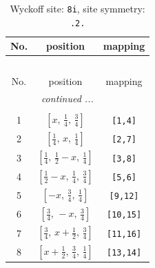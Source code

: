 \documentclass[fleqn,8pt]{jsarticle}
\begin{document}
\renewcommand{\arraystretch}{1.2}
\begin{longtable}{ccc}
\caption{Wyckoff site: {\tt 8i}, site symmetry: {\tt .2.}}
 \\
 \hline \hline
No. & position & mapping \\ \hline \endfirsthead

\multicolumn{2}{l}{\tablename\ \thetable{}} \\
 \hline \hline
No. & position & mapping \\ \hline \endhead

 \hline \hline
\multicolumn{2}{r}{\footnotesize\it continued ...} \\ \endfoot

 \hline \hline
\multicolumn{2}{r}{} \\ \endlastfoot

1 & $\left[ x,\, \frac{1}{4},\, \frac{3}{4} \right]$ & {\tt [1,4]} \\ \hline
2 & $\left[ \frac{1}{4},\, x,\, \frac{1}{4} \right]$ & {\tt [2,7]} \\ \hline
3 & $\left[ \frac{1}{4},\, \frac{1}{2} - x,\, \frac{1}{4} \right]$ & {\tt [3,8]} \\ \hline
4 & $\left[ \frac{1}{2} - x,\, \frac{1}{4},\, \frac{3}{4} \right]$ & {\tt [5,6]} \\ \hline
5 & $\left[ - x,\, \frac{3}{4},\, \frac{1}{4} \right]$ & {\tt [9,12]} \\ \hline
6 & $\left[ \frac{3}{4},\, - x,\, \frac{3}{4} \right]$ & {\tt [10,15]} \\ \hline
7 & $\left[ \frac{3}{4},\, x + \frac{1}{2},\, \frac{3}{4} \right]$ & {\tt [11,16]} \\ \hline
8 & $\left[ x + \frac{1}{2},\, \frac{3}{4},\, \frac{1}{4} \right]$ & {\tt [13,14]} \\
\end{longtable}
\renewcommand{\arraystretch}{1.2}
\end{document}
